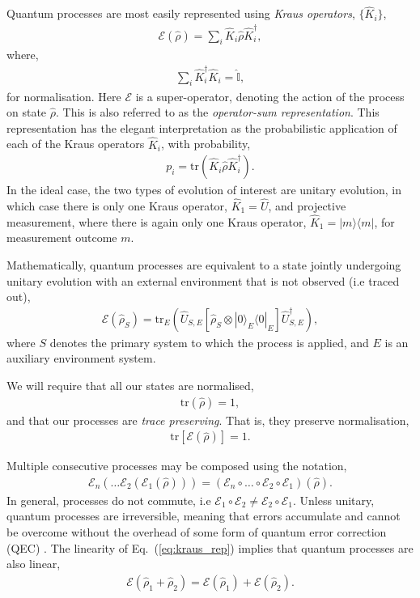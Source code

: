\documentclass[aps, rmp, twocolumn, amsmath, amssymb, nofootinbib, superscriptaddress, longbibliography, floatfix, table-of-contents, eqsecnum]{revtex4-1}
\newcommand{\bra}[1]{\langle#1|}
\newcommand{\ket}[1]{|#1\rangle}
\begin{document}
Quantum processes are most easily represented using \textit{Kraus operators}, $\{\hat{K}_i\}$,
\begin{align} \label{eq:kraus_rep}
\mathcal{E}(\hat\rho) = \sum_i \hat{K}_i \hat\rho \hat{K}_i^\dag,
\end{align}
where,
\begin{align}
\sum_i \hat{K}_i^\dag \hat{K}_i = \hat{\mathbb{I}},
\end{align}
for normalisation. Here $\mathcal{E}$ is a super-operator, denoting the action of the process on state $\hat\rho$. This is also referred to as the \textit{operator-sum representation}. This representation has the elegant interpretation as the probabilistic application of each of the Kraus operators $\hat{K}_i$, with probability,
\begin{align}
p_i = \text{tr}(\hat{K}_i \hat\rho \hat{K}_i^\dag).
\end{align}
In the ideal case, the two types of evolution of interest are unitary evolution, in which case there is only one Kraus operator, \mbox{$\hat{K}_1=\hat{U}$}, and projective measurement, where there is again only one Kraus operator, \mbox{$\hat{K}_1=\ket{m}\bra{m}$}, for measurement outcome $m$.

Mathematically, quantum processes are equivalent to a state jointly undergoing unitary evolution with an external environment that is not observed (i.e traced out),
\begin{align} \label{eq:proc_environment}
\mathcal{E}(\hat\rho_S) = \text{tr}_E (\hat{U}_{S,E} [\hat\rho_S\otimes \ket{0}_E\bra{0}_E] \hat{U}^\dag_{S,E}),
\end{align}
where $S$ denotes the primary system to which the process is applied, and $E$ is an auxiliary environment system.

We will require that all our states are normalised,
\begin{align}
\text{tr}(\hat\rho) = 1,
\end{align}
and that our processes are \textit{trace preserving}. That is, they preserve normalisation,
\begin{align}
\text{tr}[\mathcal{E}(\hat\rho)] = 1.
\end{align}

Multiple consecutive processes may be composed using the notation,
\begin{align}
\mathcal{E}_n(\dots \mathcal{E}_2(\mathcal{E}_1(\hat\rho)))=(\mathcal{E}_n \circ \dots \circ \mathcal{E}_2\circ\mathcal{E}_1)(\hat\rho).
\end{align}
In general, processes do not commute, i.e \mbox{$\mathcal{E}_1\circ \mathcal{E}_2 \neq \mathcal{E}_2\circ \mathcal{E}_1$}. Unless unitary, quantum processes are irreversible, meaning that errors accumulate and cannot be overcome without the overhead of some form of quantum error correction (QEC) \cite{bib:Shor95, bib:CalderbankShor96, bib:NielsenChuang00}. The linearity of Eq.~(\ref{eq:kraus_rep}) implies that quantum processes are also linear,
\begin{align}
	\mathcal{E}(\hat\rho_1+\hat\rho_2) = \mathcal{E}(\hat\rho_1)+\mathcal{E}(\hat\rho_2).
\end{align}
\end{document}
